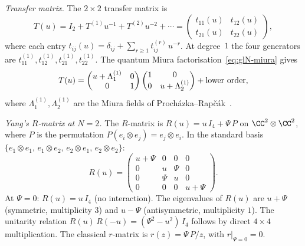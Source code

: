 \begin{example}[The $N = 2$ chiral quantum group:
$Y(\widehat{\mathfrak{gl}}_2)$ and Virasoro]
\label{ex:gl2-chiral-qg}

\emph{Transfer matrix.}
The $2 \times 2$ transfer matrix is
\begin{equation}\label{eq:gl2-transfer}
 T(u) = I_2 + T^{(1)} u^{-1} + T^{(2)} u^{-2} + \cdots
 = \begin{pmatrix}
 t_{11}(u) & t_{12}(u) \\
 t_{21}(u) & t_{22}(u)
 \end{pmatrix},
\end{equation}
where each entry $t_{ij}(u) = \delta_{ij}
+ \sum_{r \geq 1} t_{ij}^{(r)}\, u^{-r}$.
At degree~$1$ the four generators are
$t_{11}^{(1)}, t_{12}^{(1)}, t_{21}^{(1)}, t_{22}^{(1)}$.
The quantum Miura factorisation~\eqref{eq:glN-miura}
gives
\[
 T(u) = \begin{pmatrix} u + \Lambda_1^{(1)} & 0 \\
 0 & 1 \end{pmatrix}
 \begin{pmatrix} 1 & 0 \\
 0 & u + \Lambda_2^{(1)} \end{pmatrix}
 + \textup{lower order},
\]
where $\Lambda_1^{(1)}, \Lambda_2^{(1)}$ are the Miura
fields of Proch\'azka--Rap\v{c}\'ak~\cite{PR19}.

\medskip
\emph{Yang's $R$-matrix at $N = 2$.}
The $R$-matrix is $R(u) = u\, I_4 + \Psi\, P$ on
$\CC^2 \otimes \CC^2$, where $P$ is the permutation
$P(e_i \otimes e_j) = e_j \otimes e_i$.
In the standard basis
$\{e_1 \otimes e_1,\, e_1 \otimes e_2,\,
e_2 \otimes e_1,\, e_2 \otimes e_2\}$:
\begin{equation}\label{eq:gl2-R-explicit}
 R(u) =
 \begin{pmatrix}
 u + \Psi & 0 & 0 & 0 \\
 0 & u & \Psi & 0 \\
 0 & \Psi & u & 0 \\
 0 & 0 & 0 & u + \Psi
 \end{pmatrix}.
\end{equation}
At $\Psi = 0$: $R(u) = u\, I_4$ (no interaction). The
eigenvalues of $R(u)$ are $u + \Psi$ (symmetric, multiplicity
$3$) and $u - \Psi$ (antisymmetric, multiplicity $1$). The
unitarity relation $R(u)\, R(-u) = (\Psi^2 - u^2)\, I_4$
follows by direct $4 \times 4$ multiplication.
The classical $r$-matrix is
$r(z) = \Psi\, P/z$, with $r|_{\Psi = 0} = 0$.


\end{example}
